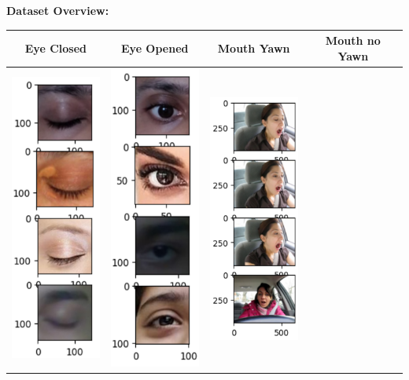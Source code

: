 \documentclass{modeleRapport}
\begin{document}
\textbf{Dataset Overview:}
\begin{table}[H]
    \centering
    \begin{tabular}{|c|c|c|c|}
        \hline
        Eye Closed & Eye Opened & Mouth Yawn & Mouth no Yawn \\
        \hline
        \includegraphics[width=3cm]{Images/eyeClosed.png}
        &
        \includegraphics[width=3cm]{Images/eyeOpen.png}
        &
        \includegraphics[width=3cm]{Images/yawn.png}

\end{tabular}
\end{table}
\end{document}
